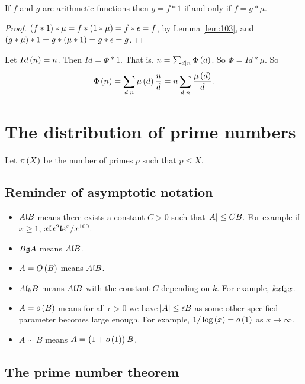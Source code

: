 \begin{proposition}
If $ f $ and $ g $ are arithmetic functions then $ g = f * 1 $ if and only if $ f = g * \mu $.
\end{proposition}

\begin{proof}
$ \br{f * 1} * \mu = f * \br{1 * \mu} = f * \epsilon = f $, by Lemma \ref{lem:103}, and $ \br{g * \mu} * 1 = g * \br{\mu * 1} = g * \epsilon = g $.
\end{proof}

\begin{example*}
Let $ Id\br{n} = n $. Then $ Id = \Phi * 1 $. That is, $ n = \sum_{d \mid n} \Phi\br{d} $. So $ \Phi = Id * \mu $. So
$$ \Phi\br{n} = \sum_{d \mid n} \mu\br{d}\dfrac{n}{d} = n\sum_{d \mid n} \dfrac{\mu\br{d}}{d}. $$
\end{example*}

\pagebreak

\section{The distribution of prime numbers}

Let $ \pi\br{X} $ be the number of primes $ p $ such that $ p \le X $.

\subsection{Reminder of asymptotic notation}

\begin{itemize}
\item $ A \l B $ means there exists a constant $ C > 0 $ such that $ \abs{A} \le CB $. For example if $ x \ge 1 $, $ x \l x^2 \l e^x / x^{100} $.
\item $ B \g A $ means $ A \l B $.
\item $ A = O\br{B} $ means $ A \l B $.
\item $ A \l_k B $ means $ A \l B $ with the constant $ C $ depending on $ k $. For example, $ kx \l_k x $.
\item $ A = o\br{B} $ means for all $ \epsilon > 0 $ we have $ \abs{A} \le \epsilon B $ as some other specified parameter becomes large enough. For example, $ 1 / \log\br{x} = o\br{1} $ as $ x \to \infty $.
\item $ A \sim B $ means $ A = \br{1 + o\br{1}}B $.
\end{itemize}

\subsection{The prime number theorem}

